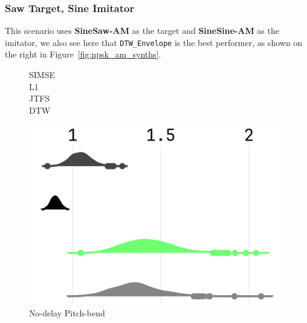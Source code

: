 \documentclass{article} %
\newcommand{\DTWEnv}{\texttt{DTW\_Envelope}\xspace}
\newcommand{\FMMod}{\textbf{SineSaw-AM}\xspace}
\newcommand{\FMModvtwo}{\textbf{SineSine-AM}\xspace}
\begin{document}
\subsubsection{Saw Target, Sine Imitator}
\label{sec:am_sawtarget_sineimitate}
This scenario uses \FMMod as the target and \FMModvtwo as the imitator, we also see here that \DTWEnv is the best performer, as shown on the right in Figure~\ref{fig:npsk_am_synths}.



\begin{figure}[t]
  \centering
  \begin{minipage}[t]{\textwidth}
    \begin{minipage}[t]{0.045\textwidth}
      \footnotesize\raggedleft
      \vspace{-3cm} %
      SIMSE\\[0.4cm]
      L1\\[0.385cm]
      JTFS\\[0.365cm]
      DTW
    \end{minipage}%
    \hspace{0.01\textwidth}%
    \begin{minipage}[t]{0.91\textwidth}
      \centering
      \begin{minipage}[t]{0.31\textwidth}
        \centering
        \includegraphics[width=\linewidth]{images/npsk_ood_P_Loss_4.png}
        \vspace{0.3em}
        \footnotesize No-delay Pitch-bend
      \end{minipage}
      \hspace{0.015\textwidth}%

\end{minipage}
\end{minipage}
\end{figure}
\end{document}
